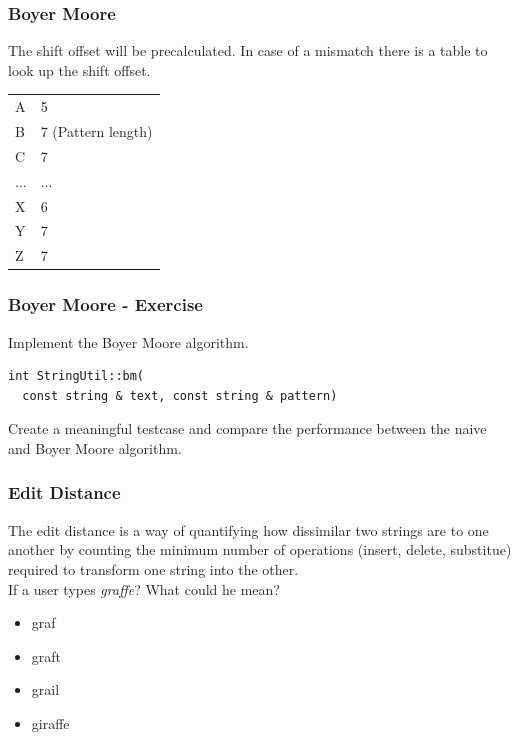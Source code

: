 \begin{frame}[fragile] 
\frametitle{Boyer Moore}
The shift offset will be precalculated. In case of a mismatch there is a table to
look up the shift offset.\\

\begin{tabular}{l|l}
A & 5\\
B & 7 (Pattern length)\\
C & 7\\
...& ...\\
X & 6\\
Y & 7\\
Z & 7
\end{tabular}
\end{frame}

\begin{frame}[fragile] 
\frametitle{Boyer Moore - Exercise}
\begin{exercise}
Implement the Boyer Moore algorithm.
\begin{lstlisting}
int StringUtil::bm(
  const string & text, const string & pattern)
\end{lstlisting}
\end{exercise}
\begin{exercise}
Create a meaningful testcase and compare the performance between the naive and Boyer Moore algorithm. 
\end{exercise}
\end{frame}

\begin{frame}[fragile]
\frametitle{Edit Distance}
The edit distance is a way of quantifying how dissimilar two strings are to one another by counting the minimum number of operations (insert, delete, substitue) required to transform one string into the other.\\
\vspace{3mm}
If a user types \emph{graffe}? What could he mean?
\begin{itemize}
\item graf
\item graft
\item grail
\item giraffe
\end{itemize}

\end{frame}

